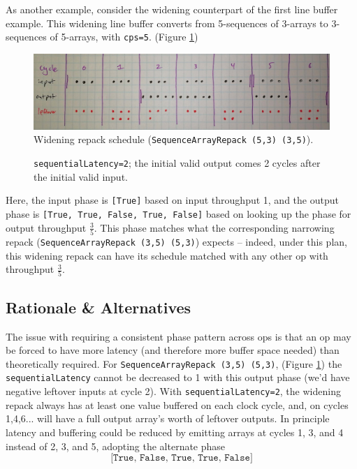\documentclass[12pt]{article}
\begin{document}
\newpage
As another example, consider the widening counterpart of the first
line buffer example. This widening line buffer converts from
5-sequences of 3-arrays to 3-sequences of 5-arrays, with
\texttt{cps=5}. (Figure \ref{widening.jpg})

\begin{figure}[bth]
\includegraphics[width=1.0\linewidth]{Figures/widening.jpg}
Widening repack schedule (\texttt{SequenceArrayRepack (5,3) (3,5)}).

\caption{\texttt{sequentialLatency=2}; the initial valid output comes 2 cycles
after the initial valid input.}
\label{widening.jpg}
\end{figure}

Here, the input phase is \texttt{[True]} based on input throughput 1,
and the output phase is \texttt{[True, True, False, True, False]}
based on looking up the phase for output throughput
$\frac{3}{5}$. This phase matches what the corresponding narrowing
repack (\texttt{SequenceArrayRepack (3,5) (5,3)}) expects -- indeed,
under this plan, this widening repack can have its schedule matched
with any other op with throughput $\frac{3}{5}$.

\subsection{Rationale \& Alternatives}

The issue with requiring a consistent phase pattern across ops is that
an op may be forced to have more latency (and therefore more buffer
space needed) than theoretically required. For
\texttt{SequenceArrayRepack (3,5) (5,3)}, (Figure \ref{widening.jpg})
the \texttt{sequentialLatency} cannot be decreased to 1 with this
output phase (we'd have negative leftover inputs at cycle 2). With
\texttt{sequentialLatency=2}, the widening repack always has at least
one value buffered on each clock cycle, and, on cycles 1,4,6... will
have a full output array's worth of leftover outputs.  In principle
latency and buffering could be reduced by emitting arrays at cycles 1,
3, and 4 instead of 2, 3, and 5, adopting the alternate phase
\begin{equation}
    \texttt{[True, False, True, True, False]} %
    \label{alternate-phase}
\end{equation}
\end{document}
